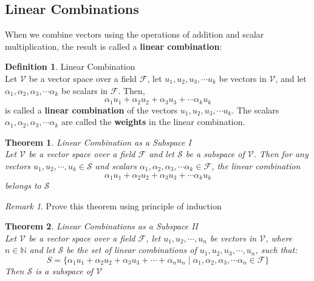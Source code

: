 \documentclass{book}
\newtheorem{theorem}{Theorem}[section]
\theoremstyle{definition}
\newtheorem{definition}{Definition}[section]
\theoremstyle{remark}
\newtheorem{remark}{Remark}
\newcommand{\bb}[1]{\mathbb{#1}}
\newcommand{\cc}[1]{\mathcal{#1}}
\begin{document}
\newpage
\subsection{Linear Combinations}

When we combine vectors using the operations of addition and scalar multiplication, the result is called a \textbf{linear combination}:

\begin{definition}
Linear Combination \\

    Let $\cc{V}$ be a vector space over a field $\cc{F}$, let $u_1, u_2, u_3, \cdots u_k$ be vectors in $\cc{V}$, and let $\alpha_1, \alpha_2, \alpha_3, \cdots \alpha_k$ be scalars in $\cc{F}$. Then, 
        \begin{equation*}
            \alpha_1 u_1 + \alpha_2 u_2 + \alpha_3 u_3 + \cdots \alpha_k u_k
        \end{equation*}
    is called a \textbf{linear combination} of the vectors $u_1, u_2, u_3, \cdots u_k$. The scalars $\alpha_1, \alpha_2, \alpha_3, \cdots \alpha_k$ are called the \textbf{weights} in the linear combination.  
\end{definition}


\begin{tcolorbox}
    \begin{theorem}
    Linear Combination as a Subspace I \\
        Let $\cc{V}$ be a vector space over a field $\cc{F}$ and let $\cc{S}$ be a subspace of $\cc{V}$. Then for any vectors  $u_1, u_2, \cdots, u_k \in \cc{S}$ and scalars $\alpha_1, \alpha_2, \alpha_3, \cdots \alpha_k \in \cc{F}$, the linear combination 
            \begin{equation*}
                \alpha_1 u_1 + \alpha_2 u_2 + \alpha_3 u_3 + \cdots \alpha_k u_k
            \end{equation*}
        belongs to $\cc{S}$
    \end{theorem}
    
    \begin{remark}
        Prove this theorem using principle of induction
    \end{remark}
\end{tcolorbox}

\begin{tcolorbox}
    \begin{theorem}
    Linear Combinations as a Subspace II \\
    
        Let $\cc{V}$ be a vector space over a field $\cc{F}$, let $u_1, u_2, \cdots, u_n$ be vectors in $\cc{V}$, where $n \in \bb{N}$ and let $\cc{S}$ be the set of linear combinations of $u_1, u_2, u_3, \cdots, u_n$, such that:
            \begin{equation*}
                S = \{ \alpha_1 u_1 + \alpha_2 u_2 + \alpha_3 u_3 + \cdots + \alpha_n u_n \; | \; \alpha_1, \alpha_2, \alpha_3, \cdots \alpha_n \in \cc{F} \}
            \end{equation*}
        Then $\cc{S}$ is a subspace of $\cc{V}$
    \end{theorem}
\end{tcolorbox}
\end{document}

